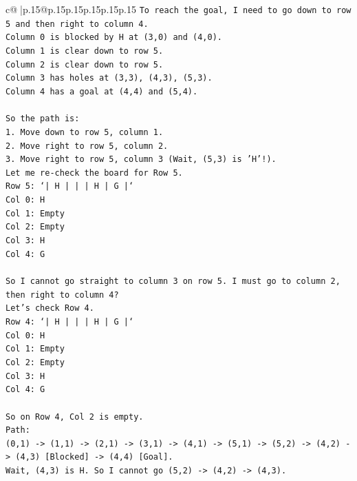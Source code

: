 \documentclass{article}
\begin{document}
{\begin{supertabular}{c@{$\;$}|p{.15\linewidth}@{}p{.15\linewidth}p{.15\linewidth}p{.15\linewidth}p{.15\linewidth}p{.15\linewidth}}
{{{\texttt{To reach the goal, I need to go down to row 5 and then right to column 4.} \\
\texttt{Column 0 is blocked by H at (3,0) and (4,0).} \\
\texttt{Column 1 is clear down to row 5.} \\
\texttt{Column 2 is clear down to row 5.} \\
\texttt{Column 3 has holes at (3,3), (4,3), (5,3).} \\
\texttt{Column 4 has a goal at (4,4) and (5,4).} \\
\\ 
\texttt{So the path is:} \\
\texttt{1. Move down to row 5, column 1.} \\
\texttt{2. Move right to row 5, column 2.} \\
\texttt{3. Move right to row 5, column 3 (Wait, (5,3) is 'H'!).} \\
\texttt{Let me re{-}check the board for Row 5.} \\
\texttt{Row 5: `|  H  |     |     |  H  |  G  |`} \\
\texttt{Col 0: H} \\
\texttt{Col 1: Empty} \\
\texttt{Col 2: Empty} \\
\texttt{Col 3: H} \\
\texttt{Col 4: G} \\
\\ 
\texttt{So I cannot go straight to column 3 on row 5. I must go to column 2, then right to column 4?} \\
\texttt{Let's check Row 4.} \\
\texttt{Row 4: `|  H  |     |     |  H  |  G  |`} \\
\texttt{Col 0: H} \\
\texttt{Col 1: Empty} \\
\texttt{Col 2: Empty} \\
\texttt{Col 3: H} \\
\texttt{Col 4: G} \\
\\ 
\texttt{So on Row 4, Col 2 is empty.} \\
\texttt{Path:} \\
\texttt{(0,1) {-}> (1,1) {-}> (2,1) {-}> (3,1) {-}> (4,1) {-}> (5,1) {-}> (5,2) {-}> (4,2) {-}> (4,3) {[}Blocked{]} {-}> (4,4) {[}Goal{]}.} \\
\texttt{Wait, (4,3) is H. So I cannot go (5,2) {-}> (4,2) {-}> (4,3).} \\
}}}
\end{supertabular}}
\end{document}
